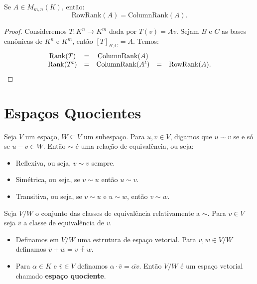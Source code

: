 \documentclass[11pt,twoside,a4paper]{book}
\begin{document}
\begin{corolario}
Se $A\in M_{m,n}(K)$, então:
\[
\mathrm{Row Rank}(A)=\mathrm{Column Rank}(A).
\]
\end{corolario}
\begin{proof}
Consideremos $T:K^n\rightarrow K^m$ dada por $T(v)=Av$. Sejam $B$ e $C$ as bases canônicas de $K^n$ e $K^m$, então $[T]_{B,C}=A$. Temos:
\[
\begin{array}{ccccc}
\mathrm{Rank}(T)&=&\mathrm{Column Rank}(A)&&\\
\mathrm{Rank}(T^t)&=&\mathrm{Column Rank}(A^t)&=&\mathrm{Row Rank}(A).
\end{array} \qedhere
\]
\end{proof}

\section{Espaços Quocientes}

\begin{definicao}
Seja $V$ um espaço, $W\subseteq V$ um subespaço. Para $u,v\in V$, digamos que $u\sim v$ se e só se $u-v\in W$. Então $\sim$ é uma relação de equivalência, ou seja:
\begin{itemize}
\item Reflexiva, ou seja, $v\sim v$ sempre.
\item Simétrica, ou seja, se $v\sim u$ então $u\sim v$.
\item Transitiva, ou seja, se $v\sim u$ e $u\sim w$, então $v\sim w$.
\end{itemize}
Seja $V/W$ o conjunto das classes de equivalência relativamente a $\sim$. Para $v\in V$ seja $\overline{v}$ a classe de equivalência de $v$.
\begin{itemize}
\item Definamos em $V/W$ uma estrutura de espaço vetorial. Para $\overline{v},\overline{w}\in V/W$ definamos $\overline{v}+\overline{w}=\overline{v+w}$.
\item Para $\alpha\in K$ e $\overline{v}\in V$ definamos $\alpha\cdot\overline{v}=\overline{\alpha v}$. Então $V/W$ é um espaço vetorial chamado \textbf{espaço quociente}.
\end{itemize}
\end{definicao}
\end{document}
